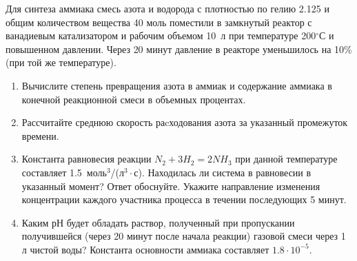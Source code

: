 
Для синтеза аммиака смесь азота и водорода с плотностью по гелию 2.125 и общим количеством вещества 40 моль 
поместили в замкнутый реактор с ванадиевым катализатором и рабочим объемом 10~л при температуре 200$^{\circ}$С и 
повышенном давлении. Через 20 минут давление в реакторе уменьшилось на 10\% (при той же температуре). 

\begin{enumerate}
    \item Вычислите степень превращения азота в аммиак и содержание аммиака в конечной реакционной смеси в 
    объемных процентах.
    \item Рассчитайте среднюю скорость раcходования азота за указанный промежуток времени.
    \item Константа равновесия реакции $N_2 + 3H_2 = 2NH_3$ при данной температуре составляет 1.5~моль$^3$/(л$^3 \cdot$с). 
    Находилась ли система в равновесии в указанный момент? Ответ обоснуйте. Укажите направление изменения 
    концентрации каждого участника процесса в течении последующих 5 минут. 
    \item Каким рН будет обладать раствор, полученный при пропускании получившейся (через 20 минут 
    после начала реакции) газовой смеси через 1 л чистой воды? Константа основности аммиака составляет $1.8 \cdot 10^{-5}$.  
\end{enumerate}